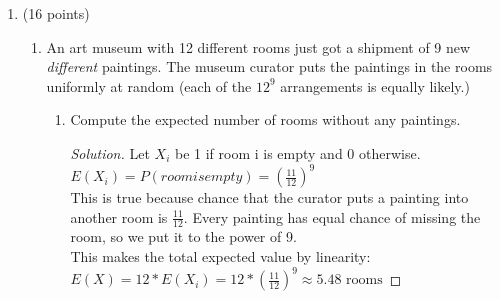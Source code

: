 \documentclass[10pt,letterpaper,unboxed,cm]{article}
\newenvironment{solution}
  {\begin{proof}[Solution]}
  {\end{proof}}
\begin{document}
\begin{enumerate}
\begin{enumerate}
\item
Compute the expected number of swaps (A swap is a pair of elements $(a_i,a_j)$ such that $a_i=j$ and $a_j=i$ and $i<j$.)

\begin{solution}
    Let $X_ij$ be 1 if $a_i = j and a_j = i$, 0 otherwise.\\
    To find the probability of $X_ij$ we can split it into two probabilities:\\
    \(P(a_i = j) = \frac{1}{n} \hspace{2cm} P(a_j = i) = \frac{1}{n-1}\)\\
    n-1 comes from the fact that the first number is already chosen: $a_i$.\\
    The combined probability is then:\\
    \(P(a_i = j \text{ and } a_j = i) = P(a_i = j) * P(a_j = i) = \frac{1}{n} * \frac{1}{n-1} = \frac{1}{n(n-1)}\)\\
    The total expected value then becomes:\\
    \(\sum_{i<i}^{j<n} E(X_i) = \binom{n}{2} * \frac{1}{n(n-1)} = \frac{n!}{(n-2)!2!} * \frac{1}{n(n-1)} = \frac{n(n-1)(n-2)!}{(n-2)!2!} * \frac{1}{n(n-1)} = \frac{n(n-1)}{2*n(n-1)} = \boxed{\frac{1}{2}}\)\\
   $\binom{n}{2}$ comes from number of pairs we can make with n numbers. 
\end{solution}

\end{enumerate}



\item (16 points)
\begin{enumerate}
\item
An art museum with 12 different rooms just got a shipment of 9 new \emph{different} paintings. The museum curator puts the paintings in the rooms uniformly at random (each of the $12^9$ arrangements is equally likely.)

\begin{enumerate}
\item
Compute the expected number of rooms without any paintings.

\begin{solution}
    Let $X_i$ be 1 if room i is empty and 0 otherwise.\\
    \(E(X_i) = P(room is empty) = (\frac{11}{12})^9\)\\
    This is true because chance that the curator puts a painting into another room is $\frac{11}{12}$. Every painting has equal chance of missing the room, so we put it to the power of 9.\\
    This makes the total expected value by linearity:\\
    \(E(X) = 12 * E(X_i) = 12 * (\frac{11}{12})^9 \approx \boxed{5.48 \text{ rooms}}\)
\end{solution}


\end{enumerate}
\end{enumerate}
\end{enumerate}
\end{document}
